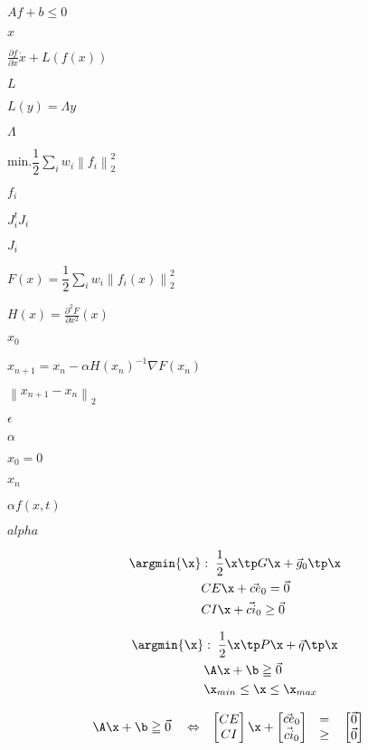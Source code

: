 \documentclass{article}
\begin{document}
$ Af+b \le 0 $
\pagebreak

$ x $
\pagebreak

$ \frac{\partial f}{\partial x} \dot{x} + L(f(x)) $
\pagebreak

$ L $
\pagebreak

$ L(y) = \Lambda y $
\pagebreak

$ \Lambda $
\pagebreak

$ \mbox{min.} \dfrac{1}{2} \sum_i{ w_i \left\| f_i \right\|^2_2} $
\pagebreak

$ f_i $
\pagebreak

$ J_i^t J_i $
\pagebreak

$ J_i $
\pagebreak

$ F(x) = \dfrac{1}{2} \sum_i{ w_i \left\| f_i(x) \right\|^2_2} $
\pagebreak

$ H(x)=\frac{\partial^2 F}{\partial x^2}(x)$
\pagebreak

$ x_0 $
\pagebreak

$ x_{n+1} = x_n - \alpha H(x_n)^{-1} \nabla F(x_n) $
\pagebreak

$ \left\|x_{n+1} - x_n\right\|_2$
\pagebreak

$ \epsilon $
\pagebreak

$ \alpha $
\pagebreak

$ x_0=0 $
\pagebreak

$ x_n $
\pagebreak

$ \alpha f(x,t) $
\pagebreak

$ alpha $
\pagebreak

\begin{align*} \argmin{\x} &: \; \frac{1}{2} \x\tp G \x + \vec{g}_0\tp \x \\ & CE \x + \vec{ce}_0 = \vec{0} \\ & CI \x + \vec{ci}_0 \geq \vec{0} \end{align*}
\pagebreak

\begin{align*} \argmin{\x} &: \; \frac{1}{2} \x\tp P \x + \vec{q}\tp \x \\ & \A \x + \b \geqq \vec{0} \\ & \x_{min} \leq \x \leq \x_{max} \end{align*}
\pagebreak

\begin{align*} \A \x + \b &\geqq \vec{0} & &\Leftrightarrow &\begin{bmatrix} CE \\ CI \end{bmatrix} \x + \begin{bmatrix} \vec{ce}_0 \\ \vec{ci}_0 \end{bmatrix} & \quad \begin{matrix} = \\ \geq \end{matrix} \quad \begin{bmatrix} \vec{0} \\ \vec{0} \end{bmatrix} \end{align*}
\pagebreak
\end{document}
